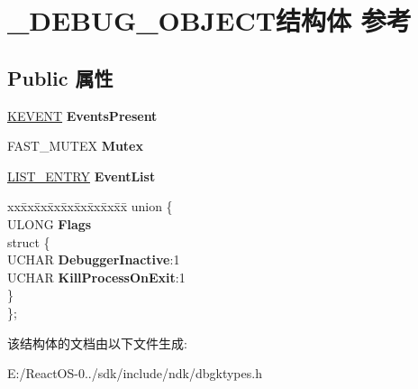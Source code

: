 \hypertarget{struct___d_e_b_u_g___o_b_j_e_c_t}{}\section{\+\_\+\+D\+E\+B\+U\+G\+\_\+\+O\+B\+J\+E\+C\+T结构体 参考}
\label{struct___d_e_b_u_g___o_b_j_e_c_t}
\subsection*{Public 属性}
\begin{DoxyCompactItemize}
\item 
\mbox{\label{struct___d_e_b_u_g___o_b_j_e_c_t_a2794b67c6b822fd2291d0becbeaf4c02}} 
\hyperlink{struct___k_e_v_e_n_t}{K\+E\+V\+E\+NT} {\bfseries Events\+Present}
\item 
\mbox{\label{struct___d_e_b_u_g___o_b_j_e_c_t_a1c4ffe489a0e34e9cb4092eceb0f71eb}} 
F\+A\+S\+T\+\_\+\+M\+U\+T\+EX {\bfseries Mutex}
\item 
\mbox{\label{struct___d_e_b_u_g___o_b_j_e_c_t_ae2dd37284c6f7e6f5c329070febf6330}} 
\hyperlink{struct___l_i_s_t___e_n_t_r_y}{L\+I\+S\+T\+\_\+\+E\+N\+T\+RY} {\bfseries Event\+List}
\item 
\mbox{\label{struct___d_e_b_u_g___o_b_j_e_c_t_af8c8e1a548a5b7de5e0bc5b993aab729}} 
\begin{tabbing}
xx\=xx\=xx\=xx\=xx\=xx\=xx\=xx\=xx\=\kill
union \{\\
\>ULONG {\bfseries Flags}\\
\mbox{\label{union___d_e_b_u_g___o_b_j_e_c_t_1_1_0D1985_a3ce252190102f4d1badd0439add20b6b}} 
\>struct \{\\
\>\>UCHAR {\bfseries DebuggerInactive}:1\\
\>\>UCHAR {\bfseries KillProcessOnExit}:1\\
\>\} \\
\}; \\

\end{tabbing}\end{DoxyCompactItemize}


该结构体的文档由以下文件生成\+:\begin{DoxyCompactItemize}
\item 
E\+:/\+React\+O\+S-\/0../sdk/include/ndk/dbgktypes.\+h\end{DoxyCompactItemize}
